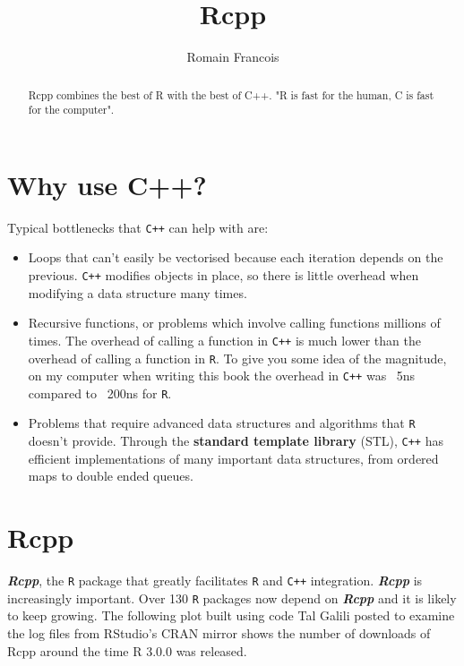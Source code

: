 \documentclass[]{article}
\title{Rcpp}
\author{Romain Francois}
\begin{document}
\maketitle

\begin{abstract}
Rcpp combines the best of R with the best of C++.
"R is fast for the human, C is fast for the computer".
\end{abstract}

\section{Why use C++?}
Typical bottlenecks that \texttt{C++} can help with are:

\begin{itemize}
\item Loops that can't easily be vectorised because each iteration depends on the previous. \texttt{C++} modifies objects in place, so there is little overhead when modifying a data structure many times.

\item Recursive functions, or problems which involve calling functions millions of times. The overhead of calling a function in \texttt{C++} is much lower than the overhead of calling a function in \texttt{R}. To give you some idea of the magnitude, on my computer when writing this book the overhead in \texttt{C++} was ~5ns compared to ~200ns for \texttt{R}.

\item Problems that require advanced data structures and algorithms that \texttt{R} doesn't provide. Through the \textbf{standard template library} (STL), \texttt{C++} has efficient implementations of many important data structures, from ordered maps to double ended queues.
\end{itemize}

\newpage
\section{Rcpp}
\textit{\textbf{Rcpp}}, the \texttt{R} package that greatly facilitates \texttt{R} and \texttt{C++} integration. \textit{\textbf{Rcpp}} is increasingly important. Over 130 \texttt{R} packages now depend on \textbf{\textit{Rcpp}} and it is likely to keep growing. The following plot built using code Tal Galili posted to examine the log files from RStudio’s CRAN mirror shows the number of downloads of Rcpp around the time R 3.0.0 was released.
\end{document}
